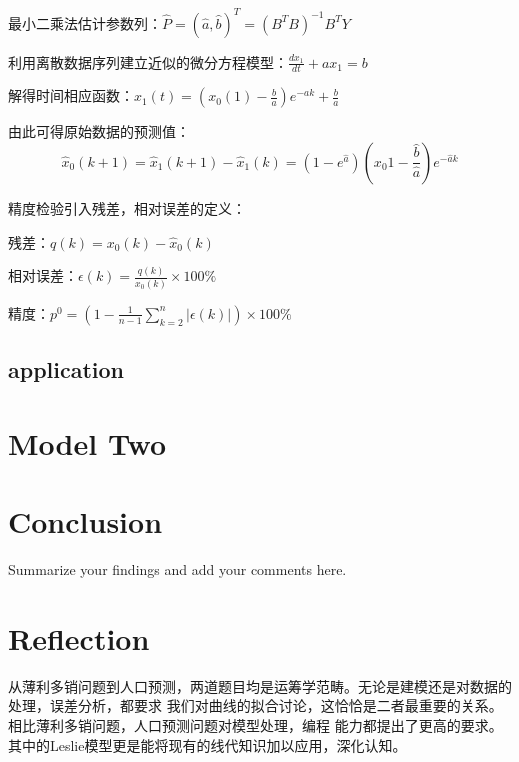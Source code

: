 \documentclass{article}
\begin{document}
最小二乘法估计参数列：$\hat{P}=(\hat{a},\hat{b})^T=(B^TB)^{-1}B^TY$

利用离散数据序列建立近似的微分方程模型：$\frac{dx_1}{dt}+ax_1=b$

解得时间相应函数：$x_1(t)=(x_0(1)-\frac{b}{a})e^{-ak}+\frac{b}{a}$

由此可得原始数据的预测值：
$$
\hat{x}_0(k+1)=\hat{x}_1(k+1)-\hat{x}_1(k)
=(1-e^{\hat{a}})(x_0{1}-\frac{\hat{b}}{\hat{a}})e^{-\hat{a}k}
$$

精度检验引入残差，相对误差的定义：

残差：$q(k)=x_0(k)-\hat{x}_0(k)$

相对误差：$\epsilon(k)=\frac{q(k)}{x_0(k)}\times100\%$

精度：$p^0=(1-\frac{1}{n-1}\sum_{k=2}^n\left|\epsilon(k)\right|)\times100\%$

\subsection{application}


\section{Model Two}

\section{Conclusion}

Summarize your findings and add your comments here.


\section{Reflection}

从薄利多销问题到人口预测，两道题目均是运筹学范畴。无论是建模还是对数据的处理，误差分析，都要求
我们对曲线的拟合讨论，这恰恰是二者最重要的关系。相比薄利多销问题，人口预测问题对模型处理，编程
能力都提出了更高的要求。其中的Leslie模型更是能将现有的线代知识加以应用，深化认知。
\end{document}
